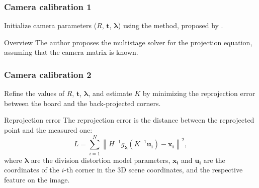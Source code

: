 \documentclass{beamer}
\begin{document}
\begin{frame}
\begin{figure}[h]
		\label{fig:corner_prototypes}
	\end{figure}

\end{frame}

\begin{frame}
	\frametitle{Camera calibration 1}

	Initialize camera parameters (\(R\), \(\mathbf{t}\),
	\(\boldsymbol{\lambda}\)) using the method, proposed by
	\cite{scaramuzzaToolboxEasilyCalibrating2006}.

	\begin{exampleblock}{Overview}
		The author proposes the multistage solver for the projection equation,
		assuming that the camera matrix is known.
	\end{exampleblock}
\end{frame}

\begin{frame}
	\frametitle{Camera calibration 2}

	Refine the values of \(R\), \(\mathbf{t}\), \(\boldsymbol{\lambda}\), and
	estimate \(K\) by minimizing the reprojection error between the
	board and the back-projected corners.

	\begin{exampleblock}{Reprojection error}
		The reprojection error is the distance between the reprojected point and the
		measured one:
		\begin{equation*}
			L = \sum_{i=1}^{N} \left\lVert
			H^{-1} g_{ \boldsymbol{\lambda}}(K^{-1} \mathbf{u_i}) -
			\mathbf{x_i} \right\rVert^2,
		\end{equation*}
		where \(\boldsymbol{\lambda}\) are the division distortion model
		parameters, \( \mathbf{x_{i}}\) and \(\mathbf{u_{i}}\) are the coordinates
		of the \(i\)-th corner in the 3D scene coordinates, and the respective
		feature on the image.
	\end{exampleblock}
\end{frame}
\end{document}
